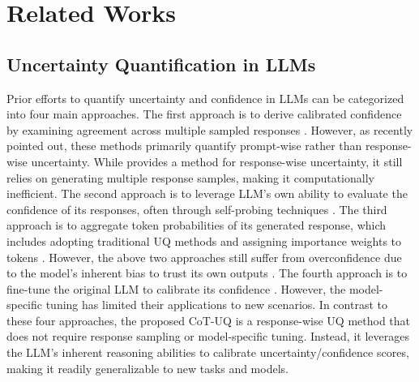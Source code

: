 \section{Related Works}
\subsection{Uncertainty Quantification in LLMs}
Prior efforts to quantify uncertainty and confidence in LLMs can be categorized into four main approaches. The first approach is to derive calibrated confidence by examining agreement across multiple sampled responses \citep{malinin2021uncertainty, kuhn2023semantic, manakul2023selfcheckgpt, tian2023fine}. However, as \citet{qiu2024semantic} recently pointed out, these methods primarily quantify prompt-wise rather than response-wise uncertainty. While \citet{qiu2024semantic} provides a method for response-wise uncertainty, it still relies on generating multiple response samples, making it computationally inefficient. The second approach is to leverage LLM's own ability to evaluate the confidence of its responses, often through self-probing techniques \citep{kadavath2022language, tian2023just, xiong2023can}. The third approach is to aggregate token probabilities of its generated response, which includes adopting traditional UQ methods \citep{xiao2022uncertainty, ye2024benchmarking} and assigning importance weights to tokens \citep{duan2024shifting, bakman2024mars}. However, the above two approaches still suffer from overconfidence due to the model’s inherent bias to trust its own outputs \citep{mielke2022reducing, lin2022teaching}. The fourth approach is to fine-tune the original LLM to calibrate its confidence \citep{lin2022teaching, kapoor2024large}. However, the model-specific tuning has limited their applications to new scenarios. In contrast to these four approaches, the proposed CoT-UQ is a response-wise UQ method that does not require response sampling or model-specific tuning. Instead, it leverages the LLM’s inherent reasoning abilities to calibrate uncertainty/confidence scores, making it readily generalizable to new tasks and models. 

